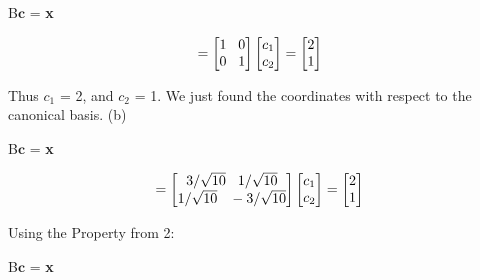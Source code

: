\documentclass[11pt]{article}
\begin{document}
\begin{center}

B$\textbf{c}$ = \textbf{x}

\end{center}
\begin{center}

\[
=
\begin{bmatrix}
   1 \hspace{3mm} 0 \\
 0 \hspace{3mm} 1
\end{bmatrix}
\begin{bmatrix}
   c_1\\
 c_2 
\end{bmatrix} 
= 
\begin{bmatrix}
   2\\
 1 
\end{bmatrix} 
\]

\end{center}

\vspace{3mm}
Thus $c_1$ = 2, and $c_2$ = 1. We just found the coordinates with respect to the canonical basis.\newline
(b)
\begin{center}

B$\textbf{c}$ = \textbf{x}

\end{center}
\begin{center}

\[
=
\begin{bmatrix}
   3/\sqrt{10} \hspace{3mm}   1/\sqrt{10} \\
   1/\sqrt{10} \hspace{3mm}   -3/\sqrt{10}           
\end{bmatrix}
\begin{bmatrix}
   c_1\\
 c_2 
\end{bmatrix} 
= 
\begin{bmatrix}
   2\\
 1 
\end{bmatrix} 
\]

\end{center}

Using the Property from 2:

\begin{center}

B$\textbf{c}$ = \textbf{x}

\end{center}
\end{document}
